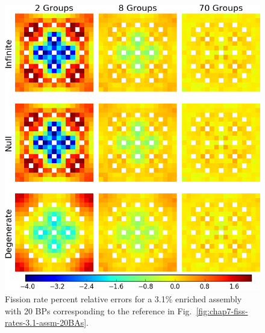 \begin{figure}[h!]
\centering
\includegraphics[width=\linewidth]{figures/quantification/assm-31-20BPs/fiss-err}
\caption[Fission rate errors for a 3.1\% enriched assembly with 20 BPs]{Fission rate percent relative errors for a 3.1\% enriched assembly with 20 BPs corresponding to the reference in Fig.~\ref{fig:chap7-fiss-rates-3.1-assm-20BAs}.}
\label{fig:chap8-assm-3.1-20BPs-fiss-err}
\end{figure}

\clearpage

